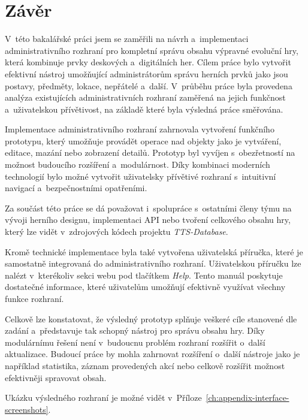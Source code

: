\chapter{Závěr}
\label{ch:conclusion}

V~této bakalářské práci jsem se zaměřili na návrh a~implementaci administrativního rozhraní pro kompletní správu obsahu výpravné evoluční hry, která kombinuje prvky deskových a~digitálních her. Cílem práce bylo vytvořit efektivní nástroj umožňující administrátorům správu herních prvků jako jsou postavy, předměty, lokace, nepřátelé a~další. V~průběhu práce byla provedena analýza existujících administrativních rozhraní zaměřená na jejich funkčnost a~uživatelskou přívětivost, na základě které byla výsledná práce směřována.

Implementace administrativního rozhraní zahrnovala vytvoření funkčního prototypu, který umožňuje provádět operace nad objekty jako je vytváření, editace, mazání nebo zobrazení detailů. Prototyp byl vyvíjen s~obezřetností na možnost budoucího rozšíření a~modulárnost. Díky kombinaci moderních technologií bylo možné vytvořit uživatelsky přívětivé rozhraní s~intuitivní navigací a~bezpečnostními opatřeními.

Za součást této práce se dá považovat i~spolupráce s~ostatními členy týmu na vývoji herního designu, implementaci API nebo tvoření celkového obsahu hry, který lze vidět v~zdrojových kódech projektu \textit{TTS-Database}.

Kromě technické implementace byla také vytvořena uživatelská příručka, které je samostatně integrovaná do administrativního rozhraní. Uživatelskou příručku lze nalézt v~kterékoliv sekci webu pod tlačítkem \textit{Help}. Tento manuál poskytuje dostatečné informace, které uživatelům umožňují efektivně využívat všechny funkce rozhraní.

Celkově lze konstatovat, že výsledný prototyp splňuje veškeré cíle stanovené dle zadání a~představuje tak schopný nástroj pro správu obsahu hry. Díky modulárnímu řešení není v~budoucnu problém rozhraní rozšířit o~další aktualizace. Budoucí práce by mohla zahrnovat rozšíření o~další nástroje jako je například statistika, záznam provedených akcí nebo celkově rozšířit možnost efektivněji spravovat obsah.

Ukázku výsledného rozhraní je možné vidět v~Příloze~\ref{ch:appendix-interface-screenshots}.

\endinput